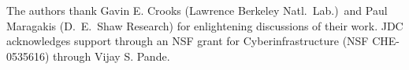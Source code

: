 \documentclass[aps,pre,twocolumn,superscriptaddress,nofootinbib]{revtex4}
\begin{document}
\begin{acknowledgments}
The authors thank Gavin E. Crooks (Lawrence Berkeley Natl.~Lab.)~and Paul Maragakis (D.~E.~Shaw Research) for enlightening discussions of their work.
JDC acknowledges support through an NSF grant for Cyberinfrastructure (NSF CHE-0535616) through Vijay S. Pande.
\end{acknowledgments}

 

\end{document}
